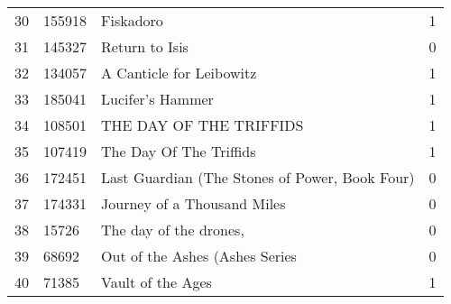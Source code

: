 \begin{tabular}{llll}
30 & 155918 & Fiskadoro & 1 \\
31 & 145327 & Return to Isis & 0 \\
32 & 134057 & A Canticle for Leibowitz & 1 \\
33 & 185041 & Lucifer's Hammer & 1 \\
34 & 108501 & THE DAY OF THE TRIFFIDS & 1 \\
35 & 107419 & The Day Of The Triffids & 1 \\
36 & 172451 & Last Guardian (The Stones of Power, Book Four) & 0 \\
37 & 174331 & Journey of a Thousand Miles & 0 \\
38 & 15726 & The day of the drones, & 0 \\
39 & 68692 & Out of the Ashes (Ashes Series #1) & 0 \\
40 & 71385 & Vault of the Ages & 1 \\
\bottomrule
\end{tabular}
